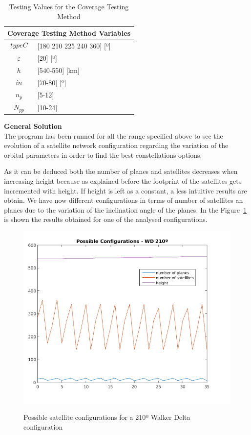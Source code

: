 \begin{table}[H]
\centering
\begin{tabular}{|c|l|}
\hline
\multicolumn{2}{|c|}{Coverage Testing Method Variables}     \\ \hline
$$typeC$$          & {[}180 210 225 240 360{]} {[}º{]} 			 \\ \hline
$\varepsilon$      & {[}20{]} {[}º{]}                         \\ \hline
$$h$$              & {[}540-550{]} {[}km{]}                   \\ \hline
$$in$$             & {[}70-80{]} {[}º{]}                 \\ \hline
$n_{p}$            & {[}5-12{]}                        \\ \hline
$N_{pp}$           & {[}10-24{]}                    \\ \hline
\end{tabular}
\caption{Testing Values for the Coverage Testing Method}
\end{table}  

\textbf{General Solution}\\

The program has been runned for all the range specified above to see the evolution of a satellite network configuration regarding the variation of the orbital parameters in order to find the best constellations options.

As it can be deduced both the number of planes and satellites decreases when increasing height because as explained before the footprint of the satellites gets incremented with height.
If height is left as a constant, a less intuitive results are obtain. We have now different configurations in terms of number of satellites an planes due to the variation of the inclination angle of the planes.
In the Figure~\ref{fig:graph120} is shown the results obtained for one of the analysed configurations. \\

\begin{figure}%
	\centering
	\includegraphics[width=.6\textwidth]{./testing/graph210.png}\\
	\caption{Possible satellite configurations for a 210º Walker Delta configuration}
	\label{fig:graph120}
\end{figure}

